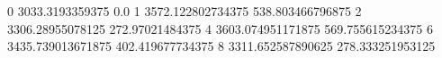 0 3033.3193359375 0.0
1 3572.122802734375 538.803466796875
2 3306.28955078125 272.97021484375
4 3603.074951171875 569.755615234375
6 3435.739013671875 402.419677734375
8 3311.652587890625 278.333251953125
